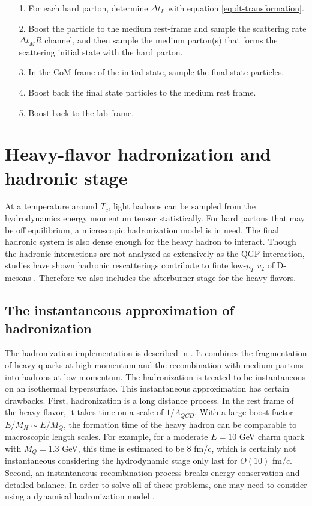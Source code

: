 \begin{itemize}
\item[1.] For each hard parton, determine $\Delta t_L$ with equation \ref{eq:dt-transformation}.
\item[2.] Boost the particle to the medium rest-frame and sample the scattering rate $\Delta t_M R$ channel, and then sample the medium parton(s) that forms the scattering initial state with the hard parton.
\item[3.] In the CoM frame of the initial state, sample the final state particles.
\item[4.] Boost back the final state particles to the medium rest frame.
\item[5.] Boost back to the lab frame.
\end{itemize}

\section{Heavy-flavor hadronization and hadronic stage}
\label{section:hadronization}
At a temperature around $T_c$, light hadrons can be sampled from the hydrodynamics energy momentum tensor statistically.
For hard partons that may be off equilibrium, a microscopic hadronization model is in need.
The final hadronic system is also dense enough for the heavy hadron to interact.
Though the hadronic interactions are not analyzed as extensively as the QGP interaction, studies have shown hadronic rescatterings contribute to finte low-$p_T$ $v_2$ of D-mesons \cite{Cao:2015hia}.
Therefore we also includes the afterburner stage for the heavy flavors.

\subsection{The instantaneous approximation of hadronization} 
The hadronization implementation is described in \cite{Cao:2013ita}.
It combines the fragmentation of heavy quarks at high momentum and the recombination with medium partons into hadrons at low momentum.
The hadronization is treated to be instantaneous on an isothermal hypersurface.
This instantaneous approximation has certain drawbacks.
First, hadronization is a long distance process. 
In the rest frame of the heavy flavor, it takes time on a scale of $1/\Lambda_{QCD}$. 
With a large boost factor $E/M_H\sim E/M_Q$, the formation time of the heavy hadron can be comparable to macroscopic length scales.
For example, for a moderate $E=10$ GeV charm quark with $M_Q=1.3$ GeV, this time is estimated to be $8$ fm/c, which is certainly not instantaneous considering the hydrodynamic stage only last for $O(10)$ fm/$c$.
Second, an instantaneous recombination process breaks energy conservation and detailed balance.
In order to solve all of these problems, one may need to consider using a dynamical hadronization model \cite{He:2019vgs}.

